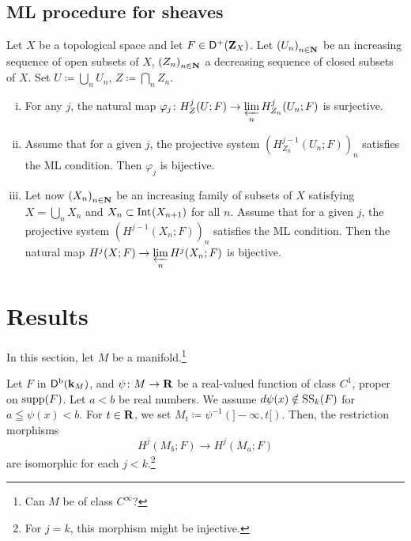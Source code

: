 \subsection*{ML procedure for sheaves}

\begin{Proposition+}[{\cite[Proposition 2.7.1]{KS90}}]\label{prop:ks2.7.1}
  Let \(X\) be a topological space and let \(F\in\Dompl(\zz_X)\). 
  Let \(\left(U_n\right)_{n\in\nn}\) be an increasing sequence 
  of open subsets of \(X\), \(\left(Z_n\right)_{n\in\nn}\) 
  a decreasing sequence of closed subsets of \(X\). 
  Set \(U\coloneqq\bigcup_{n}U_{n}\), 
  \(Z\coloneqq\bigcap_{n}Z_{n}\). 
  \begin{enumerate}[(i)]
    \item For any \(j\), the natural map \(
      \varphi_j\colon H^{j}_{Z}(U;F)
      \to 
      \prolim[n]H^{j}_{Z_{n}}(U_{n};F)
    \) is surjective. 
    \item Assume that for a given \(j\), 
    the projective system \(
      (H^{j-1}_{Z_{n}}(U_{n};F))_{n}
    \) satisfies the ML condition. 
    Then \(\varphi_{j}\) is bijective. 
    \item Let now \(\left(X_{n}\right)_{n\in\nn}\) be 
    an increasing family of subsets of \(X\) satisfying \(
      X=\bigcup_{n}X_n\) and \(X_{n}\subset \Int[](X_{n+1})
    \) for all \(n\). 
    Assume that for a given \(j\), the projective system \(
      \left(H^{j-1}(X_{n};F)\right)_{n}
    \) satisfies the ML condition. 
    Then the natural map \(
      H^{j}(X;F)\to \prolim[n]H^{j}(X_{n};F)
    \) is bijective. 
  \end{enumerate}
\end{Proposition+}

\section{Results}

In this section, 
let \(M\) be a manifold.\footnote{
  Can \(M\) be of class \(C^\infty\)?
}

\begin{Theorem+}\label{thm:t-morse}
  Let \(F\) in \(\Dompb(\kk_M)\), and 
  \(\psi\colon M\to \rr\) be a real-valued function of 
  class \(C^1\), 
  proper on \(\supp(F)\). 
  Let \(a<b\) be real numbers.
  We assume \(d\psi(x)\notin \muS[k](F)\) for \(
    a\leqq \psi(x)<b
  \). For \(t\in \rr\), we set \(
    M_t\coloneqq\psi^{-1}\left(]-\infty,t[\right)
  \). 
  Then, the restriction morphisms\[
    H^{j}(M_{b};F)\to H^{j}(M_{a};F)
  \]
  are isomorphic for each \(j< k\).\footnote{
    For \(j=k\), this morphism might be injective.
  }
\end{Theorem+}

